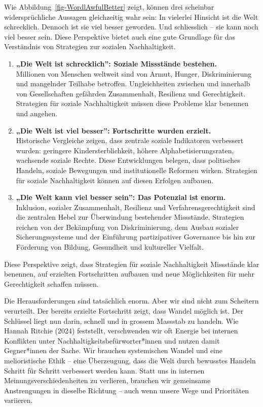 \documentclass[
  nswissgerman,
  a4paper,
  DIV=11,
  numbers=noendperiod,
  oneside,
  openany]{scrreprt}
\begin{document}
Wie Abbildung~\ref{fig-WordlAwfulBetter} zeigt, können drei scheinbar
widersprüchliche Aussagen gleichzeitig wahr sein: In vielerlei Hinsicht
ist die Welt schrecklich. Dennoch ist sie viel besser geworden. Und
schliesslich -- sie kann noch viel besser sein. Diese Perspektive bietet
auch eine gute Grundlage für das Verständnis von Strategien zur sozialen
Nachhaltigkeit.

\begin{enumerate}
\def\labelenumi{\arabic{enumi}.}
\item
  \textbf{„Die Welt ist schrecklich'': Soziale Missstände bestehen.}\\
  Millionen von Menschen weltweit sind von Armut, Hunger,
  Diskriminierung und mangelnder Teilhabe betroffen. Ungleichheiten
  zwischen und innerhalb von Gesellschaften gefährden Zusammenhalt,
  Resilienz und Gerechtigkeit. Strategien für soziale Nachhaltigkeit
  müssen diese Probleme klar benennen und angehen.
\item
  \textbf{„Die Welt ist viel besser'': Fortschritte wurden erzielt.}\\
  Historische Vergleiche zeigen, dass zentrale soziale Indikatoren
  verbessert wurden: geringere Kindersterblichkeit, höhere
  Alphabetisierungsraten, wachsende soziale Rechte. Diese Entwicklungen
  belegen, dass politisches Handeln, soziale Bewegungen und
  institutionelle Reformen wirken. Strategien für soziale Nachhaltigkeit
  können auf diesen Erfolgen aufbauen.
\item
  \textbf{„Die Welt kann viel besser sein'': Das Potenzial ist enorm.}\\
  Inklusion, sozialer Zusammenhalt, Resilienz und
  Verfahrensgerechtigkeit sind die zentralen Hebel zur Überwindung
  bestehender Missstände. Strategien reichen von der Bekämpfung von
  Diskriminierung, dem Ausbau sozialer Sicherungssysteme und der
  Einführung partizipativer Governance bis hin zur Förderung von
  Bildung, Gesundheit und kultureller Vielfalt.
\end{enumerate}

Diese Perspektive zeigt, dass Strategien für soziale Nachhaltigkeit
Missstände klar benennen, auf erzielten Fortschritten aufbauen und neue
Möglichkeiten für mehr Gerechtigkeit schaffen müssen.

Die Herausforderungen sind tatsächlich enorm. Aber wir sind nicht zum
Scheitern verurteilt. Der bereits erzielte Fortschritt zeigt, dass
Wandel möglich ist. Der Schlüssel liegt nun darin, schnell und in
grossem Massstab zu handeln. Wie Hannah Ritchie (2024) feststellt,
verschwenden wir oft Energie bei internen Konflikten unter
Nachhaltigkeitsbefürworter*innen und nutzen damit Gegner*innen der
Sache. Wir brauchen systemischen Wandel und eine melioristische Ethik --
eine Überzeugung, dass die Welt durch bewusstes Handeln Schritt für
Schritt verbessert werden kann. Statt uns in internen
Meinungsverschiedenheiten zu verlieren, brauchen wir gemeinsame
Anstrengungen in dieselbe Richtung -- auch wenn unsere Wege und
Prioritäten variieren.
\end{document}
